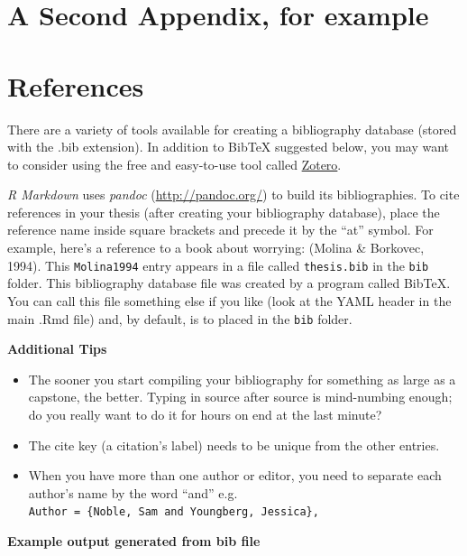 \documentclass[12pt,oneside]{chicagocapstone}
\providecommand{\tightlist}{%
  \setlength{\itemsep}{0pt}\setlength{\parskip}{0pt}}
\begin{document}
\chapter{A Second Appendix, for
example}\label{a-second-appendix-for-example}

\backmatter

\chapter*{References}\label{references}


\noindent

\setlength{\parindent}{-0.20in} \setlength{\leftskip}{0.20in}
\setlength{\parskip}{8pt}

There are a variety of tools available for creating a bibliography
database (stored with the .bib extension). In addition to BibTeX
suggested below, you may want to consider using the free and easy-to-use
tool called \href{https://www.zotero.org/}{Zotero}.

\emph{R Markdown} uses \emph{pandoc} (\url{http://pandoc.org/}) to build
its bibliographies. To cite references in your thesis (after creating
your bibliography database), place the reference name inside square
brackets and precede it by the ``at'' symbol. For example, here's a
reference to a book about worrying: (Molina \& Borkovec, 1994). This
\texttt{Molina1994} entry appears in a file called \texttt{thesis.bib}
in the \texttt{bib} folder. This bibliography database file was created
by a program called BibTeX. You can call this file something else if you
like (look at the YAML header in the main .Rmd file) and, by default, is
to placed in the \texttt{bib} folder.

\textbf{Additional Tips}
\begin{itemize}
\tightlist
\item
  The sooner you start compiling your bibliography for something as
  large as a capstone, the better. Typing in source after source is
  mind-numbing enough; do you really want to do it for hours on end at
  the last minute?
\item
  The cite key (a citation's label) needs to be unique from the other
  entries.
\item
  When you have more than one author or editor, you need to separate
  each author's name by the word ``and'' e.g.
  \texttt{Author\ =\ \{Noble,\ Sam\ and\ Youngberg,\ Jessica\},}
\end{itemize}
\textbf{Example output generated from bib file}
\end{document}
